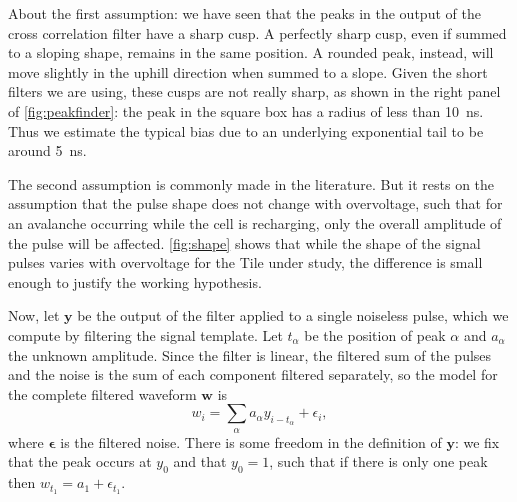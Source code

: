 About the first assumption: we have seen that the peaks in the output of the
cross correlation filter have a sharp cusp. A perfectly sharp cusp, even if
summed to a sloping shape, remains in the same position. A rounded peak,
instead, will move slightly in the uphill direction when summed to a slope.
Given the short filters we are using, these cusps are not really sharp, as
shown in the right panel of \autoref{fig:peakfinder}: the peak in the square
box has a radius of less than \SI{10}{ns}. Thus we estimate the typical bias
due to an underlying exponential tail to be around \SI{5}{ns}.

The second assumption is commonly made in the literature. But it rests on the
assumption that the pulse shape does not change with overvoltage, such that for
an avalanche occurring while the cell is recharging, only the overall amplitude
of the pulse will be affected. \autoref{fig:shape} shows that while the shape
of the signal pulses varies with overvoltage for the Tile under study, the
difference is small enough to justify the working hypothesis.

\begin{figure}
    

    
\end{figure}

Now, let $\mathbf y$ be the output of the filter applied to a single noiseless
pulse, which we compute by filtering the signal template. Let $t_\alpha$ be the
position of peak $\alpha$ and $a_\alpha$ the unknown amplitude. Since the
filter is linear, the filtered sum of the pulses and the noise is the sum of
each component filtered separately, so the model for the complete filtered
waveform $\mathbf w$ is
%
\begin{equation}
    w_i = \sum_\alpha a_\alpha y_{i - t_\alpha} + \epsilon_i,
\end{equation}
%
where $\boldsymbol\epsilon$ is the filtered noise. There is some freedom in the
definition of $\mathbf y$: we fix that the peak occurs at $y_0$ and that $y_0 =
1$, such that if there is only one peak then $w_{t_1} = a_1 + \epsilon_{t_1}$.

